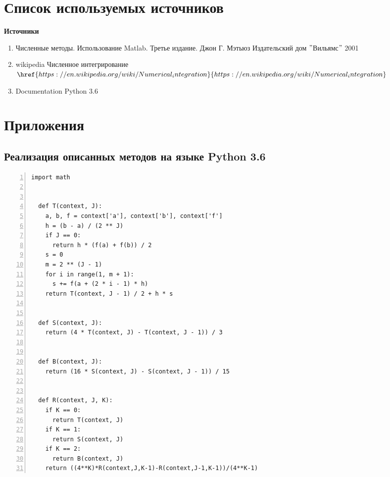 \documentclass[14pt, titlepage, a4paper]{extarticle} %
\begin{document}
	\pagebreak

	
	\section*{Список используемых источников}
	
	\textbf{Источники}
	\begin{enumerate}
		\item Численные методы. Использование Matlab. Третье издание. Джон Г. Мэтьюз Издательский дом $"$Вильямс$"$ 2001
		\item wikipedia Численное интегрирование\\ $\href{https://en.wikipedia.org/wiki/Numerical_integration}{https://en.wikipedia.org/wiki/Numerical_integration}$
		
		\item Documentation Python 3.6	
	\end{enumerate}
	
	\pagebreak
	
	
	\section*{Приложения}
	
	\subsection*{Реализация описанных методов на языке Python 3.6}
	
	\begin{Verbatim}[numbers=left,xleftmargin=0mm]
  import math
	
	
  def T(context, J):
    a, b, f = context['a'], context['b'], context['f']
    h = (b - a) / (2 ** J)
    if J == 0:
      return h * (f(a) + f(b)) / 2
    s = 0
    m = 2 ** (J - 1)
    for i in range(1, m + 1):
      s += f(a + (2 * i - 1) * h)
    return T(context, J - 1) / 2 + h * s


  def S(context, J):
    return (4 * T(context, J) - T(context, J - 1)) / 3


  def B(context, J):
    return (16 * S(context, J) - S(context, J - 1)) / 15


  def R(context, J, K):
    if K == 0:
      return T(context, J)
    if K == 1:
      return S(context, J)
    if K == 2:
      return B(context, J)
    return ((4**K)*R(context,J,K-1)-R(context,J-1,K-1))/(4**K-1)
	\end{Verbatim}
	
	\pagebreak	
	
	
\end{document}
